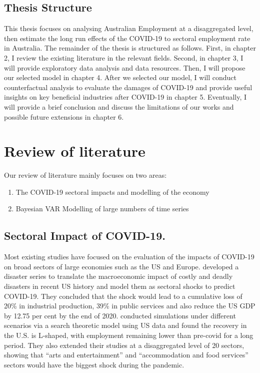 \documentclass{monashthesis}
\begin{document}
\hypertarget{thesis-structure}{%
\section{Thesis Structure}\label{thesis-structure}}

This thesis focuses on analysing Australian Employment at a disaggregated level, then estimate the long run effects of the COVID-19 to sectoral employment rate in Australia. The remainder of the thesis is structured as follows. First, in chapter 2, I review the existing literature in the relevant fields. Second, in chapter 3, I will provide exploratory data analysis and data resources. Then, I will propose our selected model in chapter 4. After we selected our model, I will conduct counterfactual analysis to evaluate the damages of COVID-19 and provide useful insights on key beneficial industries after COVID-19 in chapter 5. Eventually, I will provide a brief conclusion and discuss the limitations of our works and possible future extensions in chapter 6.

\clearpage

\hypertarget{review-of-literature}{%
\chapter{Review of literature}\label{review-of-literature}}

Our review of literature mainly focuses on two areas:

\begin{enumerate}
\def\labelenumi{\arabic{enumi}.}
\item
  The COVID-19 sectoral impacts and modelling of the economy
\item
  Bayesian VAR Modelling of large numbers of time series
\end{enumerate}

\hypertarget{sectoral-impact-of-covid-19.}{%
\section{Sectoral Impact of COVID-19.}\label{sectoral-impact-of-covid-19.}}

Most existing studies have focused on the evaluation of the impacts of COVID-19 on broad sectors of large economies such as the US and Europe. \textcite{ludvigson2020covid} developed a disaster series to translate the macroeconomic impact of costly and deadly disasters in recent US history and model them as sectoral shocks to predict COVID-19. They concluded that the shock would lead to a cumulative loss of 20\% in industrial production, 39\% in public services and also reduce the US GDP by 12.75 per cent by the end of 2020. \textcite{gregory2020pandemic} conducted simulations under different scenarios via a search theoretic model using US data and found the recovery in the U.S. is L-shaped, with employment remaining lower than pre-covid for a long period. They also extended their studies at a disaggregated level of 20 sectors, showing that ``arts and entertainment'' and ``accommodation and food services'' sectors would have the biggest shock during the pandemic.
\end{document}
